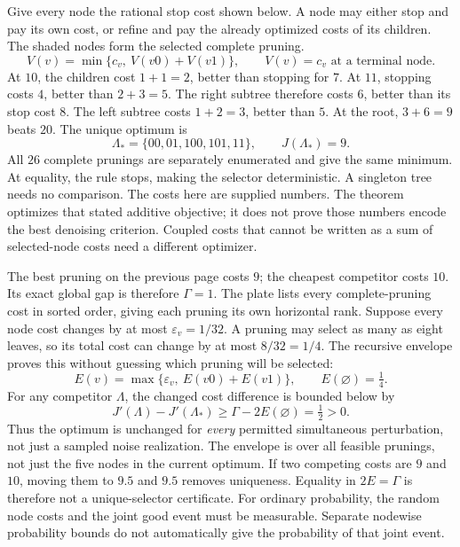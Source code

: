 Give every node the rational stop cost shown below. A node may either stop and pay its own cost, or refine and pay the already optimized costs of its children. The shaded nodes form the selected complete pruning.
\[
V(v)=\min\{c_v,\ V(v0)+V(v1)\},
\qquad V(v)=c_v\text{ at a terminal node}.
\]
At $10$, the children cost $1+1=2$, better than stopping for $7$. At $11$, stopping costs $4$, better than $2+3=5$. The right subtree therefore costs $6$, better than its stop cost $8$. The left subtree costs $1+2=3$, better than $5$. At the root, $3+6=9$ beats $20$.
The unique optimum is
\[
\Lambda_* = \{00,01,100,101,11\},\qquad J(\Lambda_*)=9.
\]
All $26$ complete prunings are separately enumerated and give the same minimum. At equality, the rule stops, making the selector deterministic. A singleton tree needs no comparison.
The costs here are supplied numbers. The theorem optimizes that stated additive objective; it does not prove those numbers encode the best denoising criterion. Coupled costs that cannot be written as a sum of selected-node costs need a different optimizer.

The best pruning on the previous page costs $9$; the cheapest competitor costs $10$. Its exact global gap is therefore $\Gamma=1$. The plate lists every complete-pruning cost in sorted order, giving each pruning its own horizontal rank.
Suppose every node cost changes by at most $\varepsilon_v=1/32$. A pruning may select as many as eight leaves, so its total cost can change by at most $8/32=1/4$. The recursive envelope proves this without guessing which pruning will be selected:
\[
E(v)=\max\{\varepsilon_v,\ E(v0)+E(v1)\},\qquad E(\varnothing)=\tfrac14.
\]
For any competitor $\Lambda$, the changed cost difference is bounded below by
\[
J'(\Lambda)-J'(\Lambda_*)\ge \Gamma-2E(\varnothing)=\tfrac12>0.
\]
Thus the optimum is unchanged for \emph{every} permitted simultaneous perturbation, not just a sampled noise realization. The envelope is over all feasible prunings, not just the five nodes in the current optimum.
If two competing costs are $9$ and $10$, moving them to $9.5$ and $9.5$ removes uniqueness. Equality in $2E=\Gamma$ is therefore not a unique-selector certificate. For ordinary probability, the random node costs and the joint good event must be measurable. Separate nodewise probability bounds do not automatically give the probability of that joint event.


